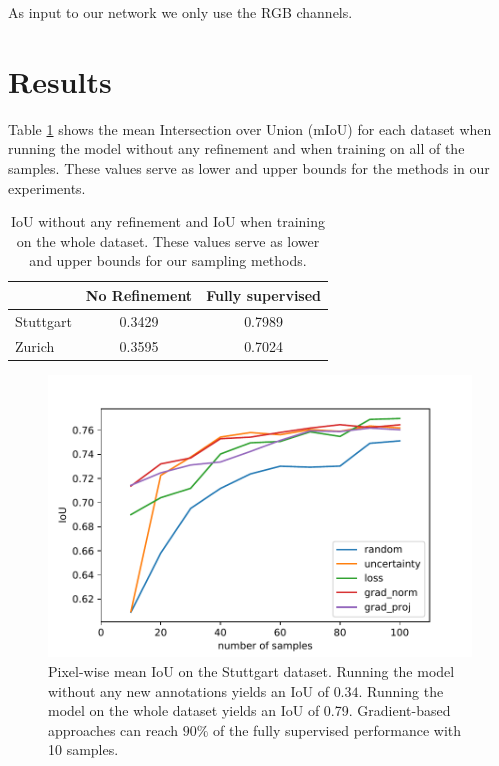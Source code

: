\documentclass[letterpaper, 10 pt, conference]{ieeeconf}  %
\begin{document}
As input to our network we only use the RGB channels.


\section{Results}


Table \ref{tab:null_and_fully_supervised} shows the mean Intersection over Union (mIoU) for each dataset when running the model without any refinement and when training on all of the samples. These values serve as lower and upper bounds for the methods in our experiments.

            \begin{table}
          \vspace{1em}
        \centering
        \caption{IoU without any refinement and IoU when training on the whole dataset. These values serve as lower and upper bounds for our sampling methods.}
        \begin{tabular}{@{}lcc@{}} 
            \toprule
              &  No Refinement  & Fully supervised \\ 
            \midrule 
    		  Stuttgart  & 0.3429 & 0.7989  \\ \addlinespace
    		  Zurich  & 0.3595 & 0.7024  \\
    	
            \bottomrule
        \end{tabular}
        \label{tab:null_and_fully_supervised}
    \end{table}


    \begin{figure}
    \centering
    \includegraphics[width=\linewidth]{pics/pw_iou_stuttgart.pdf}
   		\caption{Pixel-wise mean IoU on the Stuttgart dataset. Running the model without any new annotations yields an IoU of $0.34$. Running the model on the whole dataset yields an IoU of 0.79. Gradient-based approaches can reach $90\%$ of the fully supervised performance with 10 samples.}
		\label{fig:iou_stuttgart}    		
   \end{figure}
   
\end{document}
